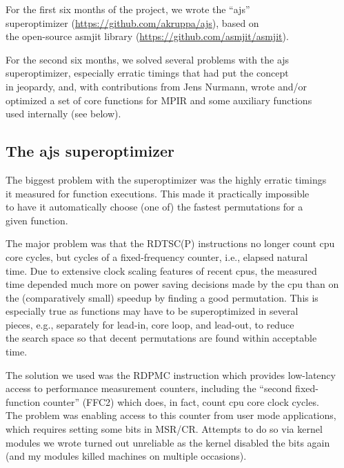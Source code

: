 For the first six months of the project, we wrote the ``ajs''\\
superoptimizer (\url{https://github.com/akruppa/ajs}), based on\\
the open-source asmjit library (\url{https://github.com/asmjit/asmjit}).

For the second six months, we solved several problems with the ajs\\
superoptimizer, especially erratic timings that had put the concept\\
in jeopardy, and, with contributions from Jens Nurmann, wrote and/or\\
optimized a set of core functions for MPIR and some auxiliary
functions\\
used internally (see below).

\subsection{The ajs superoptimizer}\label{the-ajs-superoptimizer}

The biggest problem with the superoptimizer was the highly erratic
timings\\
it measured for function executions. This made it practically
impossible\\
to have it automatically choose (one of) the fastest permutations for
a\\
given function.

The major problem was that the RDTSC(P) instructions no longer count
cpu\\
core cycles, but cycles of a fixed-frequency counter, i.e., elapsed
natural\\
time. Due to extensive clock scaling features of recent cpus, the
measured\\
time depended much more on power saving decisions made by the cpu than
on\\
the (comparatively small) speedup by finding a good permutation. This
is\\
especially true as functions may have to be superoptimized in several\\
pieces, e.g., separately for lead-in, core loop, and lead-out, to
reduce\\
the search space so that decent permutations are found within
acceptable\\
time.

The solution we used was the RDPMC instruction which provides
low-latency\\
access to performance measurement counters, including the ``second
fixed-\\
function counter'' (FFC2) which does, in fact, count cpu core clock
cycles.\\
The problem was enabling access to this counter from user mode
applications,\\
which requires setting some bits in MSR/CR. Attempts to do so via
kernel\\
modules we wrote turned out unreliable as the kernel disabled the bits
again\\
(and my modules killed machines on multiple occasions).

